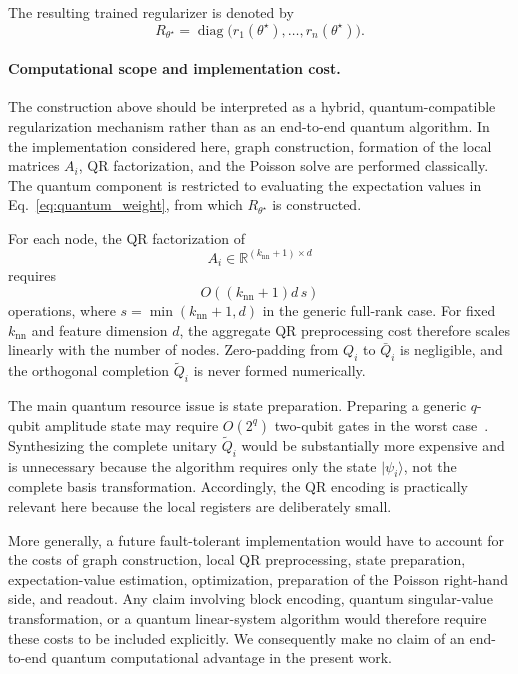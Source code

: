 \documentclass[11pt,a4paper]{article}
\begin{document}
The resulting trained regularizer is denoted by
\begin{equation}
R_{\theta^\star}
=
\operatorname{diag}
\bigl(
r_1(\theta^\star),\ldots,r_n(\theta^\star)
\bigr).
\label{eq:trained_regularizer}
\end{equation}

\paragraph{Computational scope and implementation cost.}

The construction above should be interpreted as a hybrid,
quantum-compatible regularization mechanism rather than as an end-to-end
quantum algorithm. In the implementation considered here, graph construction,
formation of the local matrices \(A_i\), QR factorization, and the Poisson
solve are performed classically. The quantum component is restricted to
evaluating the expectation values in
Eq.~\eqref{eq:quantum_weight}, from which \(R_{\theta^\star}\) is constructed.

For each node, the QR factorization of
\[
A_i
\in
\mathbb{R}^{(k_{\mathrm{nn}}+1)\times d}
\]
requires
\[
O\!\left(
(k_{\mathrm{nn}}+1)d\,s
\right)
\]
operations, where
\(s=\min(k_{\mathrm{nn}}+1,d)\) in the generic full-rank case.
For fixed \(k_{\mathrm{nn}}\) and feature dimension \(d\), the aggregate QR
preprocessing cost therefore scales linearly with the number of nodes.
Zero-padding from \(Q_i\) to \(\bar Q_i\) is negligible, and the orthogonal
completion \(\widetilde Q_i\) is never formed numerically.

The main quantum resource issue is state preparation. Preparing a generic
\(q\)-qubit amplitude state may require
\(O(2^q)\) two-qubit gates in the worst case~\cite{shende2006,reck1994}.
Synthesizing the complete unitary \(\widetilde Q_i\) would be substantially
more expensive and is unnecessary because the algorithm requires only the
state \(\lvert\psi_i\rangle\), not the complete basis transformation.
Accordingly, the QR encoding is practically relevant here because the local
registers are deliberately small.

More generally, a future fault-tolerant implementation would have to account
for the costs of graph construction, local QR preprocessing, state
preparation, expectation-value estimation, optimization, preparation of the
Poisson right-hand side, and readout. Any claim involving block encoding,
quantum singular-value transformation, or a quantum linear-system algorithm
would therefore require these costs to be included explicitly. We consequently
make no claim of an end-to-end quantum computational advantage in the present
work.
\end{document}
